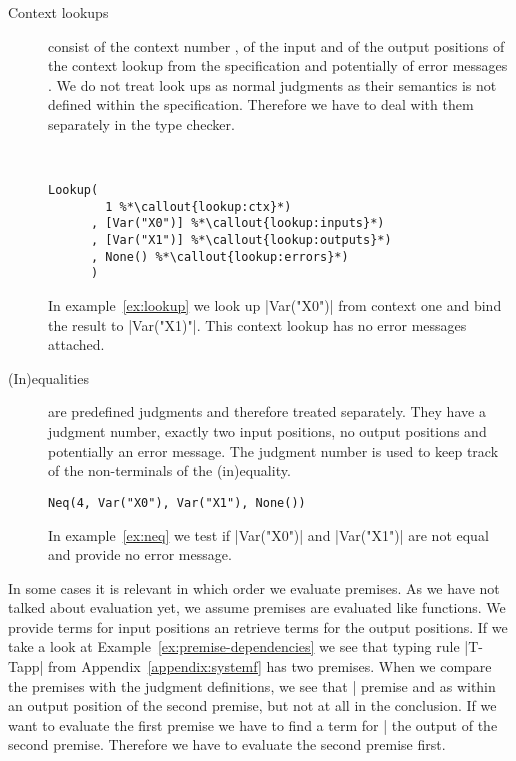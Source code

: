 \begin{description}
\item[Context lookups] consist of the context number
  , of the input  and
  of the output  positions of the context
  lookup from the specification and potentially of error messages
  . We do not treat look ups as normal
  judgments as their semantics is not defined within the
  specification. Therefore we have to deal with them separately in the
  type checker.

\begin{example}{~}
\begin{lstlisting}[language=sltc]
Lookup(
        1 %*\callout{lookup:ctx}*)
      , [Var("X0")] %*\callout{lookup:inputs}*)
      , [Var("X1")] %*\callout{lookup:outputs}*)
      , None() %*\callout{lookup:errors}*)
      )
\end{lstlisting}
\label{ex:lookup}
\end{example}

  In example~\ref{ex:lookup} we look up \code|Var("X0")| from
  context one and bind the result to \code|Var("X1)"|. This context
  lookup has no error messages attached.

\item[(In)equalities] are predefined judgments and therefore treated
  separately. They have a judgment number, exactly two input
  positions, no output positions and potentially an error message. The
  judgment number is used to keep track of the non-terminals of the
  (in)equality.

\begin{example}
\begin{lstlisting}[language=sltc]
Neq(4, Var("X0"), Var("X1"), None())
\end{lstlisting}
\label{ex:neq}
\end{example}

In example~\ref{ex:neq} we test if \code|Var("X0")| and
\code|Var("X1")| are not equal and provide no error message.
\end{description}

In some cases it is relevant in which order we evaluate premises. As
we have not talked about evaluation yet, we assume premises are
evaluated like functions. We provide terms for input positions an
retrieve terms for the output positions. If we take a look at
Example~\ref{ex:premise-dependencies} we see that typing rule
\code|T-Tapp| from Appendix~\ref{appendix:systemf} has two
premises. When we compare the premises with the judgment definitions,
we see that \code|%
premise and as within an output position of the second premise, but
not at all in the conclusion. If we want to evaluate the first premise
we have to find a term for
\code|%
the output of the second premise. Therefore we have to evaluate the
second premise first.

